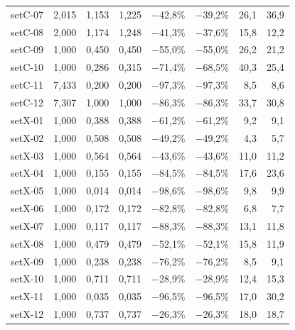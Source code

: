 \begin{table}[H]
\begin{tabular}{lrrrrrrr}
setC-07 & 2{,}015 & 1{,}153 & 1{,}225 & $-$42{,}8\% & $-$39{,}2\% & 26{,}1 & 36{,}9 \\
setC-08 & 2{,}000 & 1{,}174 & 1{,}248 & $-$41{,}3\% & $-$37{,}6\% & 15{,}8 & 12{,}2 \\
setC-09 & 1{,}000 & 0{,}450 & 0{,}450 & $-$55{,}0\% & $-$55{,}0\% & 26{,}2 & 21{,}2 \\
setC-10 & 1{,}000 & 0{,}286 & 0{,}315 & $-$71{,}4\% & $-$68{,}5\% & 40{,}3 & 25{,}4 \\
setC-11 & 7{,}433 & 0{,}200 & 0{,}200 & $-$97{,}3\% & $-$97{,}3\% & 8{,}5 & 8{,}6 \\
setC-12 & 7{,}307 & 1{,}000 & 1{,}000 & $-$86{,}3\% & $-$86{,}3\% & 33{,}7 & 30{,}8 \\
\midrule
setX-01 & 1{,}000 & 0{,}388 & 0{,}388 & $-$61{,}2\% & $-$61{,}2\% & 9{,}2 & 9{,}1 \\
setX-02 & 1{,}000 & 0{,}508 & 0{,}508 & $-$49{,}2\% & $-$49{,}2\% & 4{,}3 & 5{,}7 \\
setX-03 & 1{,}000 & 0{,}564 & 0{,}564 & $-$43{,}6\% & $-$43{,}6\% & 11{,}0 & 11{,}2 \\
setX-04 & 1{,}000 & 0{,}155 & 0{,}155 & $-$84{,}5\% & $-$84{,}5\% & 17{,}6 & 23{,}6 \\
setX-05 & 1{,}000 & 0{,}014 & 0{,}014 & $-$98{,}6\% & $-$98{,}6\% & 9{,}8 & 9{,}9 \\
setX-06 & 1{,}000 & 0{,}172 & 0{,}172 & $-$82{,}8\% & $-$82{,}8\% & 6{,}8 & 7{,}7 \\
setX-07 & 1{,}000 & 0{,}117 & 0{,}117 & $-$88{,}3\% & $-$88{,}3\% & 13{,}1 & 11{,}8 \\
setX-08 & 1{,}000 & 0{,}479 & 0{,}479 & $-$52{,}1\% & $-$52{,}1\% & 15{,}8 & 11{,}9 \\
setX-09 & 1{,}000 & 0{,}238 & 0{,}238 & $-$76{,}2\% & $-$76{,}2\% & 8{,}5 & 9{,}1 \\
setX-10 & 1{,}000 & 0{,}711 & 0{,}711 & $-$28{,}9\% & $-$28{,}9\% & 12{,}4 & 15{,}3 \\
setX-11 & 1{,}000 & 0{,}035 & 0{,}035 & $-$96{,}5\% & $-$96{,}5\% & 17{,}0 & 30{,}2 \\
setX-12 & 1{,}000 & 0{,}737 & 0{,}737 & $-$26{,}3\% & $-$26{,}3\% & 18{,}0 & 18{,}7 \\
\bottomrule
\end{tabular}
\end{table}
